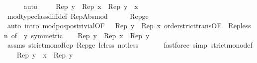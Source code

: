 \begin{isabellebody}
\ \ \ \ \isamarkupfalse%
\ auto\isanewline
\ \ \isamarkupfalse%
\ {}{\isacharcolon}{\kern0pt}\ {\isachardoublequoteopen}Rep\ y\ {\isacharminus}{\kern0pt}\ Rep\ x\ {\isacharequal}{\kern0pt}\ Rep\ {\isacharparenleft}{\kern0pt}y\ {\isacharminus}{\kern0pt}\ x{\isacharparenright}{\kern0pt}{\isachardoublequoteclose}\isanewline
\ \ \ \ \isamarkupfalse%
\ mod{\isacharunderscore}{\kern0pt}type{\isacharunderscore}{\kern0pt}class{\isachardot}{\kern0pt}diff{\isacharunderscore}{\kern0pt}def\ Rep{\isacharunderscore}{\kern0pt}Abs{\isacharunderscore}{\kern0pt}mod\isanewline
\ \ \ \ \isamarkupfalse%
\ Rep{\isacharunderscore}{\kern0pt}ge{\isacharunderscore}{\kern0pt}{}\isanewline
\ \ \ \ \isamarkupfalse%
\ {\isacharparenleft}{\kern0pt}auto\ intro{\isacharbang}{\kern0pt}{\isacharcolon}{\kern0pt}\ mod{\isacharunderscore}{\kern0pt}pos{\isacharunderscore}{\kern0pt}pos{\isacharunderscore}{\kern0pt}trivial{\isacharbrackleft}{\kern0pt}OF\ {\isacartoucheopen}{}\ {\isasymle}\ Rep\ y\ {\isacharminus}{\kern0pt}\ Rep\ x{\isacartoucheclose}\ order{\isachardot}{\kern0pt}strict{\isacharunderscore}{\kern0pt}trans{}{\isacharbrackleft}{\kern0pt}OF\ {\isacharunderscore}{\kern0pt}\ Rep{\isacharunderscore}{\kern0pt}less{\isacharunderscore}{\kern0pt}n{\isacharcomma}{\kern0pt}\ of\ {\isacharunderscore}{\kern0pt}\ y{\isacharbrackright}{\kern0pt}{\isacharcomma}{\kern0pt}\ symmetric{\isacharbrackright}{\kern0pt}{\isacharparenright}{\kern0pt}\isanewline
\ \ \isamarkupfalse%
\ {\isachardoublequoteopen}Rep\ y\ {\isacharminus}{\kern0pt}\ Rep\ x\ {\isacharless}{\kern0pt}\ Rep\ y{\isachardoublequoteclose}\isanewline
\ \ \ \ \isamarkupfalse%
\ assms{\isacharparenleft}{\kern0pt}{}{\isacharparenright}{\kern0pt}\ strict{\isacharunderscore}{\kern0pt}mono{\isacharunderscore}{\kern0pt}Rep\ Rep{\isacharunderscore}{\kern0pt}ge{\isacharunderscore}{\kern0pt}{}\ le{\isacharunderscore}{\kern0pt}less\ not{\isacharunderscore}{\kern0pt}less\ \isanewline
\ \ \ \ \isamarkupfalse%
\ {\isacharparenleft}{\kern0pt}fastforce\ simp{\isacharcolon}{\kern0pt}\ strict{\isacharunderscore}{\kern0pt}mono{\isacharunderscore}{\kern0pt}def{\isacharparenright}{\kern0pt}\isanewline
\ \ \isamarkupfalse%
\ {\isachardoublequoteopen}Rep\ {\isacharparenleft}{\kern0pt}y\ {\isacharminus}{\kern0pt}\ x{\isacharparenright}{\kern0pt}\ {\isacharless}{\kern0pt}\ Rep\ y{\isachardoublequoteclose}\isanewline
\ \ \ \ \isamarkupfalse%

\end{isabellebody}
